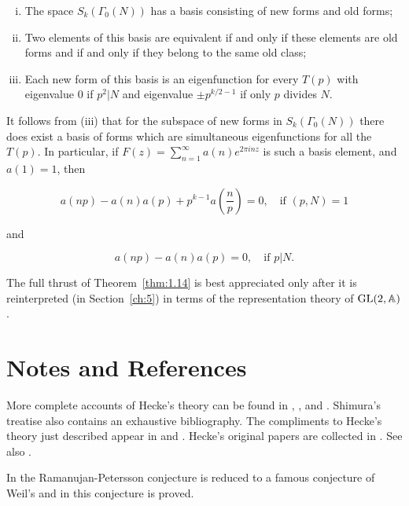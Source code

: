 \begin{theorem}\label{thm:1.14}

\begin{enumerate}[(i)]

\item The space $S_k(\Gamma_0(N))$ has a basis consisting of new forms and old forms;

\item Two elements of this basis are equivalent if and only if these elements are old forms and if and only if they belong to the same old class;

\item Each new form of this basis is an eigenfunction for every $T(p)$ with eigenvalue $0$ if $p^2 | N$ and eigenvalue $\pm p^{k/2 - 1}$ if only $p$ divides $N$.

\end{enumerate}

\end{theorem}

It follows from (iii) that for the subspace of new forms in $S_k(\Gamma_0(N))$ there does exist a basis of forms which are simultaneous eigenfunctions for all the $T(p)$. In particular, if $F(z) = \sum_{n=1}^{\infty} a(n) e^{2\pi inz}$ is such a basis element, and $a(1) = 1$, then

\[
a(np) - a(n) a(p) + p^{k-1} a\!\left(\frac{n}{p}\right) = 0, \quad \text{if } (p,N) = 1
\]

and

\[
a(np) - a(n) a(p) = 0, \quad \text{if } p | N.
\]

The full thrust of Theorem~\ref{thm:1.14} is best appreciated only after it is reinterpreted (in Section~\ref{ch:5}) in terms of the representation theory of $\operatorname{GL}(2,\mathbb{A})$.

\section*{Notes and References}


More complete accounts of Hecke's theory can be found in \cite{Shimura}, \cite{Ogg}, and \cite{Gunning}. Shimura's treatise also contains an exhaustive bibliography. The compliments to Hecke's theory just described appear in \cite{Weil} and \cite{AtkinLehner}. Hecke's original papers are collected in \cite{Hecke}. See also \cite{Serre}.

In \cite{Deligne} the Ramanujan-Petersson conjecture is reduced to a famous conjecture of Weil's and in \cite{Deligne2} this conjecture is proved.
